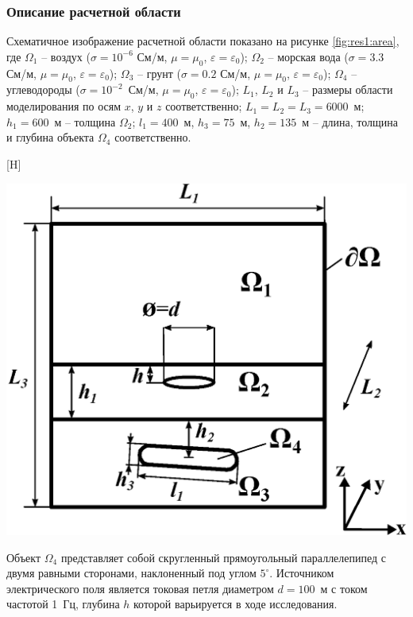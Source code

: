 \documentclass[a4paper,14pt]{article}
\makeatletter
\renewenvironment{figure}[1][\fps@figure]{
  \edef\@tempa{\noexpand\@float{figure}[#1]}
  \@tempa
  \addtocounter{foofigure}{1}
}{
  \end@float
}
\makeatother
\begin{document}
\subsubsection{Описание расчетной области}
Схематичное изображение расчетной области показано на рисунке \ref{fig:res1:area}, где $\Omega_1$ -- воздух ($\sigma=10^{-6}$ См/м, $\mu=\mu_0$, $\varepsilon=\varepsilon_0$); $\Omega_2$ -- морская вода ($\sigma=3.3$ См/м, $\mu=\mu_0$, $\varepsilon=\varepsilon_0$); $\Omega_3$ -- грунт ($\sigma=0.2$ См/м, $\mu=\mu_0$, $\varepsilon=\varepsilon_0$); $\Omega_4$ -- углеводороды ($\sigma=10^{-2}$~См/м, $\mu=\mu_0$, $\varepsilon=\varepsilon_0$); $L_1$, $L_2$ и $L_3$ -- размеры области моделирования по осям $x$, $y$ и $z$ соответственно; $L_1 = L_2 = L_3 = 6000$~м; $h_1=600$~м -- толщина $\Omega_2$; $l_1=400$~м, $h_3=75$~м, $h_2=135$~м -- длина, толщина и глубина объекта $\Omega_4$ соответственно.

\begin{figure}[H]
	\centering
	\includegraphics[scale=0.7]{research-1/area_3layers_shift_3.eps}
	\caption{схематичное изображение расчетной области}
	\label{fig:res1:area}
\end{figure}

\noindent Объект $\Omega_4$ представляет собой скругленный прямоугольный параллелепипед с двумя равными сторонами, наклоненный под углом $5^{\circ}$. Источником электрического поля является токовая петля диаметром $d=100$~м с током частотой 1~Гц, глубина $h$ которой варьируется в ходе исследования.
\end{document}
